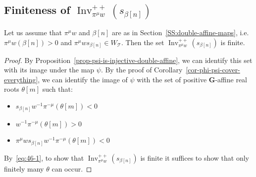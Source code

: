 \documentclass[ALCO,ThmDefs,Unicode]{cedram}
\DeclareMathOperator{\Inv}{Inv}
\newcommand{\bG}{\mathbf{G}}
\newcommand{\cT}{\mathcal{T}}
\newcommand{\WTits}{W_{\TitsCone}}
\newcommand{\TitsCone}{\cT}
\begin{document}
\subsection{Finiteness of \texorpdfstring{$\Inv^{++}_{\pi^\mu w} (s_{\beta[n]})$}{Inv++~i mu w(s beta[n])}}

\begin{theo}
Let us assume that $\pi^\mu w$ and $\beta[n]$ are as in Section~\ref{SS:double-affine-maps}, i.e.\linebreak $\pi^\mu w(\beta[n]) > 0$ and $ \pi^\mu w s_{\beta[n]} \in \WTits$. Then the set $\Inv^{++}_{\pi^\mu w} (s_{\beta[n]})$ is finite.
\end{theo}

\begin{proof}
By Proposition~\ref{prop-psi-is-injective-double-affine}, we can identify this set with its image under the map $\psi$. By the proof of Corollary~\ref{cor-phi-psi-cover-everything}, we can identify the image of $\psi$ with the set of positive $\bG$-affine real roots $\theta[m]$ such that:
\begin{itemize}
\item $s_{\beta[n]} w^{-1} \pi^{-\mu} \left(\theta[m] \right) < 0$
\item $w^{-1} \pi^{-\mu} \left(\theta[m] \right) > 0$
\item $ \pi^{\mu} w s_{\beta[n]} w^{-1} \pi^{-\mu} \left(\theta[m] \right) < 0 $
\end{itemize}
By~\eqref{eq:46-1}, to show that $\Inv^{++}_{\pi^\mu w} (s_{\beta[n]})$ is finite it suffices to show that only finitely many $\theta$ can occur.


\end{proof}
\end{document}
